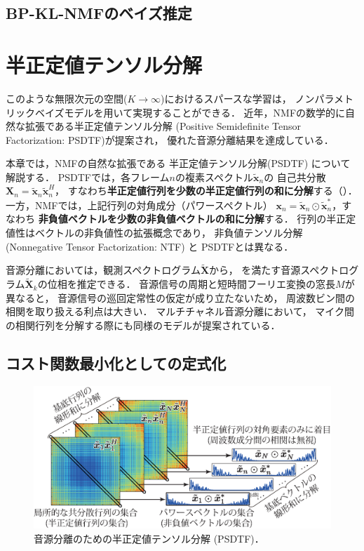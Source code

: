 \subsection{BP-KL-NMFのベイズ推定}


\section{半正定値テンソル分解}

このような無限次元の空間($K\rightarrow\infty$)におけるスパースな学習は，
ノンパラメトリックベイズモデルを用いて実現することができる\cite{hoffman:icml:2010}．
近年，NMFの数学的に自然な拡張である半正定値テンソル分解 
(Positive Semidefinite Tensor Factorization: PSDTF)\cite{yoshii:icml:2013,yoshii:ismir:2013}が提案され，
優れた音源分離結果を達成している．

本章では，NMFの自然な拡張である
半正定値テンソル分解\cite{yoshii:icml:2013,yoshii:ismir:2013}(PSDTF) について解説する．
PSDTFでは，各フレーム$n$の複素スペクトル$\tilde{\bm{x}}_n$の
自己共分散$\bm{X}_n \!=\! \tilde{\bm{x}}_n\tilde{\bm{x}}_n^H$，
すなわち{\bf 半正定値行列を少数の半正定値行列の和に分解}する（）．
一方，NMFでは，上記行列の対角成分（パワースペクトル）
$\bm{x}_n \!=\! \tilde{\bm{x}}_n \odot \tilde{\bm{x}}_n^*$，すなわち
{\bf 非負値ベクトルを少数の非負値ベクトルの和に分解}する．
行列の半正定値性はベクトルの非負値性の拡張概念であり，
非負値テンソル分解 (Nonnegative Tensor Factorization: NTF) と
PSDTFとは異なる．

音源分離においては，観測スペクトログラム$\tilde{\bm{X}}$から，
を満たす音源スペクトログラム$\tilde{\bm{X}}_k$の位相を推定できる．
音源信号の周期と短時間フーリエ変換の窓長$M$が異なると，
音源信号の巡回定常性の仮定が成り立たないため，
周波数ビン間の相関を取り扱える利点は大きい．
マルチチャネル音源分離において，
マイク間の相関行列を分解する際にも同様のモデルが提案されている\cite{sawada:ieee:2013}．

\subsection{コスト関数最小化としての定式化}
\label{sec:ps}

\begin{figure}[t]
\centering
\includegraphics[width=\columnwidth]{sections/factorization/comparison}
\caption{音源分離のための半正定値テンソル分解 (PSDTF)．}
\label{fig:comparison}
\end{figure} 

